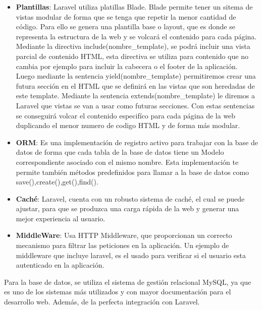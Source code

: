 \begin{itemize}

\item \textbf{Plantillas}: Laravel utiliza platillas Blade. Blade permite tener un sitema de vistas modular de forma que se tenga que repetir la menor cantidad de código. Para ello se genera una plantilla base o layout, que es donde se representa la estructura de la web y se volcará el contenido para cada página. Mediante la directiva include(nombre\_template), se podrá incluir una vista parcial de contenido HTML, esta directiva se utiliza para contenido que no cambia por ejemplo para incluir la cabecera o el footer de la aplicación. Luego mediante la sentencia yield(nombre\_template) permitiremos crear una futura sección en el HTML que se definirá en las vistas que son heredadas de este template. Mediante la sentencia extends(nombre\_template) le diremos a Laravel que vistas se van a usar como futuras secciones. Con estas sentencias se conseguirá volcar el contenido especifíco para cada página de la web duplicando el menor numero de codigo HTML y de forma más modular.

\item \textbf{ORM}: Es una implementación de registro activo para trabajar con la base de datos de forma que cada tabla de la base de datos tiene un Modelo correspondiente asociado con el mismo nombre. Esta implementación te permite también métodos predefinidos para llamar a la base de datos como save(),create(),get(),find().

\item \textbf{Caché}: Laravel, cuenta con un robusto sistema de caché, el cual se puede ajustar, para que se produzca una carga rápida de la web y generar una mejor experiencia al usuario.

\item \textbf{MiddleWare}: Usa HTTP Middleware, que proporcionan un correcto mecanismo para filtrar las peticiones en la aplicación. Un ejemplo de middleware que incluye laravel, es el usado para verificar si el usuario esta autenticado en la aplicación.

\end{itemize}

\vspace{5 mm}

Para la base de datos, se utiliza el sistema de gestión relacional MySQL, ya que es uno de los sistemas más utilizados y con mayor documentación para el desarrollo web. Además, de la perfecta integración con Laravel.

